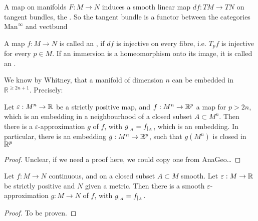 \documentclass[a4paper]{article}
\begin{document}
\begin{definition}[Differential]
A map on manifolds $F:M\to N$ induces a smooth linear map $df:TM\to TN$ on tangent bundles, the .
So the tangent bundle is a functor between the categories $\mathrm{Man}^\infty$ and $\mathrm{vectbund}$
\end{definition}\cite[p.1]{brocker}

\begin{definition}[Immersion]
  A map $f:M\to N$ is called an , if $df$ is injective on every fibre, i.e. $T_p f$ is injective for every $p\in M$. If an immersion is a homeomorphism onto its image, it is called an .
\end{definition}\cite[p.1]{brocker}


We know by Whitney, that a manifold of dimension $n$ can be embedded in $\mathbb{R}^{\geq2n+1}$. Precisely:
\begin{theorem}
  Let $\varepsilon:M^n\to\mathbb{R}$ be a strictly positive map, and $f:M^n\to\mathbb{R}^p$ a map for $p>2n$, 
  which is an embedding in a neighbourhood of a closed subset $A\subset M^n$. 
  Then there is a $\varepsilon$-approximation $g$ of $f$, with $g_{|_{A}}=f_{|_{A}}$, which is an embedding. 
  In particular, there is an embedding $g:M^n\to\mathbb{R}^p$, such that $g(M^n)$ is closed in $\mathbb{R}^p$
\end{theorem}\cite[p.1]{brocker}

\begin{proof}
  Unclear, if we need a proof here, we could copy one from AnaGeo\ldots
\end{proof}

\begin{theorem}
  Let $f:M\to N$ continuous, and on a closed subset $A\subset M$ smooth. 
  Let $\varepsilon:M\to\mathbb{R}$ be strictly positive and $N$ given a metric. 
  Then there is a smooth $\varepsilon$-approximation $g:M\to N$ of $f$, with $g_{|_{A}}=f_{|_{A}}$.
\end{theorem}\cite[p.2]{brocker}

\begin{proof}
  To be proven.
\end{proof}
\end{document}
